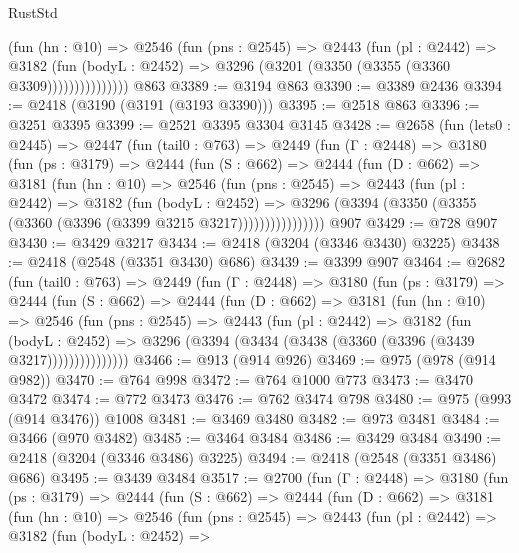 \begin{lexlean}{RustStd}
\begin{coremodule}
                  (fun (hn : @10) =>
                  @2546
                    (fun (pns : @2545) =>
                    @2443
                      (fun (pl : @2442) =>
                      @3182
                        (fun (bodyL : @2452) =>
                        @3296 (@3201 (@3350 (@3355 (@3360 @3309)))))))))))))))
    @863
@3389 := @3194 @863
@3390 := @3389 @2436
@3394 := @2418 (@3190 (@3191 (@3193 @3390)))
@3395 := @2518 @863
@3396 := @3251 @3395
@3399 := @2521 @3395 @3304 @3145
@3428 := @2658
    (fun (lets0 : @2445) =>
    @2447
      (fun (tail0 : @763) =>
      @2449
        (fun (Γ : @2448) =>
        @3180
          (fun (ps : @3179) =>
          @2444
            (fun (S : @662) =>
            @2444
              (fun (D : @662) =>
              @3181
                (fun (hn : @10) =>
                @2546
                  (fun (pns : @2545) =>
                  @2443
                    (fun (pl : @2442) =>
                    @3182
                      (fun (bodyL : @2452) =>
                      @3296 (@3394 (@3350 (@3355 (@3360 (@3396 (@3399 @3215 @3217))))))))))))))))
    @907
@3429 := @728 @907
@3430 := @3429 @3217
@3434 := @2418 (@3204 (@3346 @3430) @3225)
@3438 := @2418 (@2548 (@3351 @3430) @686)
@3439 := @3399 @907
@3464 := @2682
    (fun (tail0 : @763) =>
    @2449
      (fun (Γ : @2448) =>
      @3180
        (fun (ps : @3179) =>
        @2444
          (fun (S : @662) =>
          @2444
            (fun (D : @662) =>
            @3181
              (fun (hn : @10) =>
              @2546
                (fun (pns : @2545) =>
                @2443
                  (fun (pl : @2442) =>
                  @3182
                    (fun (bodyL : @2452) =>
                    @3296 (@3394 (@3434 (@3438 (@3360 (@3396 (@3439 @3217)))))))))))))))
@3466 := @913 (@914 @926)
@3469 := @975 (@978 (@914 @982))
@3470 := @764 @998
@3472 := @764 @1000 @773
@3473 := @3470 @3472
@3474 := @772 @3473
@3476 := @762 @3474 @798
@3480 := @975 (@993 (@914 @3476)) @1008
@3481 := @3469 @3480
@3482 := @973 @3481
@3484 := @3466 (@970 @3482)
@3485 := @3464 @3484
@3486 := @3429 @3484
@3490 := @2418 (@3204 (@3346 @3486) @3225)
@3494 := @2418 (@2548 (@3351 @3486) @686)
@3495 := @3439 @3484
@3517 := @2700
    (fun (Γ : @2448) =>
    @3180
      (fun (ps : @3179) =>
      @2444
        (fun (S : @662) =>
        @2444
          (fun (D : @662) =>
          @3181
            (fun (hn : @10) =>
            @2546
              (fun (pns : @2545) =>
              @2443
                (fun (pl : @2442) =>
                @3182
                  (fun (bodyL : @2452) =>

\end{coremodule}
\end{lexlean}
